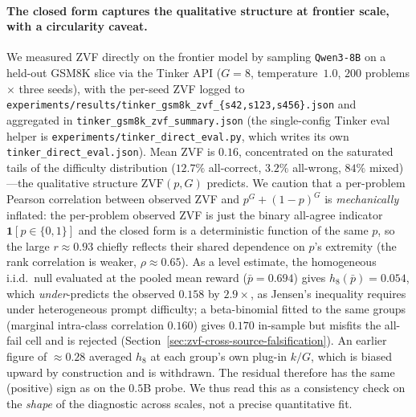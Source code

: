 \paragraph{The closed form captures the qualitative structure at frontier scale,
with a circularity caveat.} We measured ZVF directly on the frontier model by
sampling \texttt{Qwen3-8B} on a held-out GSM8K slice via the Tinker API
($G{=}8$, temperature~$1.0$, $200$ problems $\times$ three seeds), with the
per-seed ZVF logged to
\texttt{experiments/results/tinker\_gsm8k\_zvf\_\{s42,s123,s456\}.json} and
aggregated in \texttt{tinker\_gsm8k\_zvf\_summary.json} (the single-config Tinker
eval helper is \texttt{experiments/tinker\_direct\_eval.py}, which writes its own
\texttt{tinker\_direct\_eval.json}). Mean ZVF is $0.16$,
concentrated on the saturated tails of the difficulty distribution ($12.7\%$
all-correct, $3.2\%$ all-wrong, $84\%$ mixed)---the qualitative structure
$\mathrm{ZVF}(p,G)$ predicts. We caution that a per-problem Pearson correlation
between observed ZVF and $p^{G}+(1-p)^{G}$ is \emph{mechanically} inflated: the
per-problem observed ZVF is just the binary all-agree indicator
$\mathbf{1}[p \in \{0,1\}]$ and the closed form is a deterministic function of
the same $p$, so the large $r \approx 0.93$ chiefly reflects their shared
dependence on $p$'s extremity (the rank correlation is weaker,
$\rho \approx 0.65$). As a level estimate, the homogeneous i.i.d.\ null
evaluated at the pooled mean reward ($\bar p=0.694$) gives $h_8(\bar p)=0.054$,
which \emph{under}-predicts the observed $0.158$ by $2.9\times$, as Jensen's
inequality requires under heterogeneous prompt difficulty; a beta-binomial fitted
to the same groups (marginal intra-class correlation $0.160$) gives $0.170$
in-sample but misfits the all-fail cell and is rejected
(Section~\ref{sec:zvf-cross-source-falsification}). An earlier figure of
$\approx 0.28$ averaged $h_8$ at each group's own plug-in $k/G$, which is biased
upward by construction and is withdrawn. The residual therefore has the same
(positive) sign as on the $0.5$B probe. We thus
read this as a consistency check on the \emph{shape} of the diagnostic across
scales, not a precise quantitative fit.

